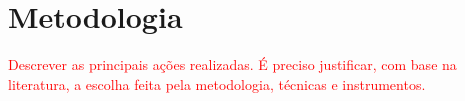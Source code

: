 
\chapter{Metodologia}
\label{chap:metodo}
\textcolor{red}{Descrever as principais ações realizadas. É preciso justificar, com base na
literatura, a escolha feita pela metodologia, técnicas e instrumentos.}

